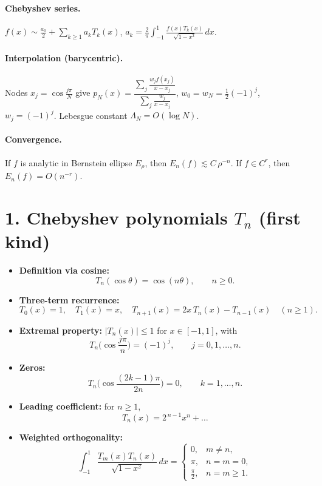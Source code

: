 \documentclass[11pt,a4paper]{article}
\theoremstyle{definition}
\theoremstyle{definition}
\theoremstyle{plain}
\theoremstyle{remark}
\begin{document}
\paragraph{Chebyshev series.}
$f(x)\sim \frac{a_0}{2}+\sum_{k\ge1} a_kT_k(x)$,
$a_k=\frac{2}{\pi}\int_{-1}^1\frac{f(x)T_k(x)}{\sqrt{1-x^2}}\,dx$.

\paragraph{Interpolation (barycentric).}
Nodes $x_j=\cos\frac{j\pi}{N}$ give
$p_N(x)=\dfrac{\sum_{j} \frac{w_j f(x_j)}{x-x_j}}{\sum_j \frac{w_j}{x-x_j}}$,
$w_0=w_N=\tfrac12(-1)^j$, $w_j=(-1)^j$.
Lebesgue constant $\Lambda_N=O(\log N)$.

\paragraph{Convergence.}
If $f$ is analytic in Bernstein ellipse $E_\rho$, then $E_n(f)\lesssim C\,\rho^{-n}$.
If $f\in C^r$, then $E_n(f)=O(n^{-r})$.

\section*{1. Chebyshev polynomials $T_n$ (first kind)}
\begin{itemize}[leftmargin=*]
	\item \textbf{Definition via cosine:}
	\[
	T_n(\cos\theta)=\cos(n\theta),\qquad n\ge 0.
	\]
	\item \textbf{Three-term recurrence:}
	\[
	T_0(x)=1,\quad T_1(x)=x,\quad T_{n+1}(x)=2x\,T_n(x)-T_{n-1}(x)\quad (n\ge 1).
	\]
	\item \textbf{Extremal property:} $|T_n(x)|\le 1$ for $x\in[-1,1]$, with
	\[
	T_n\!\Big(\cos\frac{j\pi}{n}\Big)=(-1)^j,\qquad j=0,1,\dots,n.
	\]
	\item \textbf{Zeros:}
	\[
	T_n\!\Big(\cos\frac{(2k-1)\pi}{2n}\Big)=0,\qquad k=1,\dots,n.
	\]
	\item \textbf{Leading coefficient:} for $n\ge 1$,
	\[
	T_n(x)=2^{\,n-1}x^n+\dots
	\]
	\item \textbf{Weighted orthogonality:}
	\[
	\int_{-1}^1 \frac{T_m(x)T_n(x)}{\sqrt{1-x^2}}\,dx=
	\begin{cases}
		0,& m\ne n,\\[2pt]
		\pi,& n=m=0,\\[2pt]
		\frac{\pi}{2},& n=m\ge 1.
	\end{cases}
	\]
\end{itemize}
\end{document}
